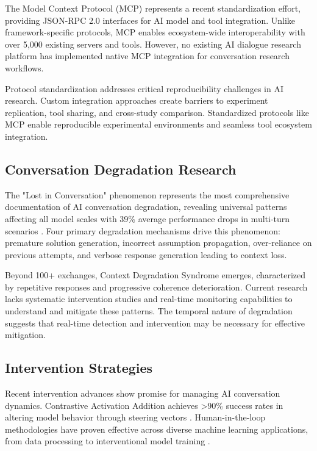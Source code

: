 \documentclass[11pt,letterpaper]{article}
\begin{document}
The Model Context Protocol (MCP) represents a recent standardization effort, providing JSON-RPC 2.0 interfaces for AI model and tool integration. Unlike framework-specific protocols, MCP enables ecosystem-wide interoperability with over 5,000 existing servers and tools. However, no existing AI dialogue research platform has implemented native MCP integration for conversation research workflows.

Protocol standardization addresses critical reproducibility challenges in AI research. Custom integration approaches create barriers to experiment replication, tool sharing, and cross-study comparison. Standardized protocols like MCP enable reproducible experimental environments and seamless tool ecosystem integration.

\subsection{Conversation Degradation Research}

The "Lost in Conversation" phenomenon represents the most comprehensive documentation of AI conversation degradation, revealing universal patterns affecting all model scales with 39\% average performance drops in multi-turn scenarios \citep{laban2025lost}. Four primary degradation mechanisms drive this phenomenon: premature solution generation, incorrect assumption propagation, over-reliance on previous attempts, and verbose response generation leading to context loss.

Beyond 100+ exchanges, Context Degradation Syndrome emerges, characterized by repetitive responses and progressive coherence deterioration. Current research lacks systematic intervention studies and real-time monitoring capabilities to understand and mitigate these patterns. The temporal nature of degradation suggests that real-time detection and intervention may be necessary for effective mitigation.

\subsection{Intervention Strategies}

Recent intervention advances show promise for managing AI conversation dynamics. Contrastive Activation Addition achieves >90\% success rates in altering model behavior through steering vectors \citep{panickssery2024activation}. Human-in-the-loop methodologies have proven effective across diverse machine learning applications, from data processing to interventional model training \citep{wu2022survey}. 
\end{document}

